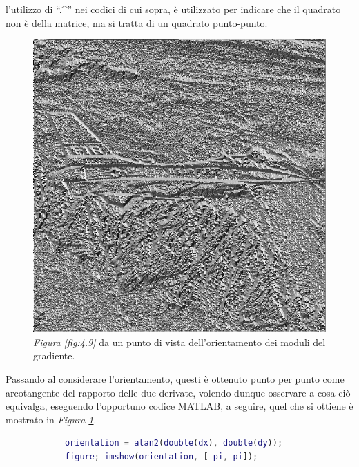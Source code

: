 \documentclass{subfiles}
\begin{document}
\begin{Note*}
    l'utilizzo di ``.\textasciicircum '' nei codici di cui sopra, è utilizzato per indicare che il quadrato non è della matrice, ma si tratta di un quadrato punto-punto.
\end{Note*}
\begin{figure}
    \centering
    \includegraphics[scale = 0.325]{../Images/Airplane/OrientationAirplane.png}
    \caption{\emph{Figura \ref{fig:4.9}} da un punto di vista dell'orientamento dei moduli del gradiente.}
    \label{fig:4.11}
\end{figure}
Passando al considerare l'orientamento, questi è ottenuto punto per punto come arcotangente del rapporto delle due derivate,
volendo dunque osservare a cosa ciò equivalga, eseguendo l'opportuno codice MATLAB, a seguire, quel che si ottiene è mostrato in \emph{Figura \ref{fig:4.11}}.
\begin{center}
    \begin{lstlisting}[language = MATLAB]
            % dx e dy sono le immagine sin ora calcolate
            orientation = atan2(double(dx), double(dy));
            figure; imshow(orientation, [-pi, pi]);
        \end{lstlisting}
\end{center}
\end{document}
